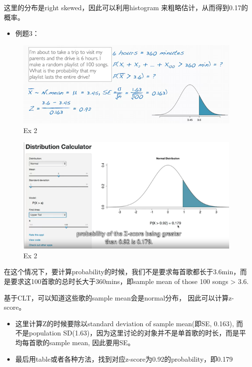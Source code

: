 \documentclass[]{book}
\providecommand{\tightlist}{%
  \setlength{\itemsep}{0pt}\setlength{\parskip}{0pt}}
\begin{document}
这里的分布是right skewed，因此可以利用histogram
来粗略估计，从而得到0.17的概率。

\begin{itemize}
\tightlist
\item
  例题3：
\end{itemize}

\begin{figure}

{\centering \includegraphics[width=0.8\linewidth]{graphs/1-8} 

}

\caption{Ex 2}\label{fig:fig81}
\end{figure}\begin{figure}

{\centering \includegraphics[width=0.8\linewidth]{graphs/1-9} 

}

\caption{Ex 2}\label{fig:fig82}
\end{figure}

在这个情况下，要计算probability的时候，我们不是要求每首歌都长于3.6min，而是要求这100首歌的总时长大于360mins，即sample
mean of those 100 songs \textgreater{} 3.6.

基于CLT，可以知道这些歌的sample mean会是normal分布，
因此可以计算z-score。

\begin{itemize}
\tightlist
\item
  这里计算Z的时候要除以standard deviation of sample mean(即SE, 0.163),
  而不是population
  SD(1.63)，因为这里讨论的对象并不是单首歌的时长，而是平均每首歌的sample
  mean, 因此要用SE。
\item
  最后用table或者各种方法，找到对应z-score为0.92的probability，即0.179
\end{itemize}
\end{document}
